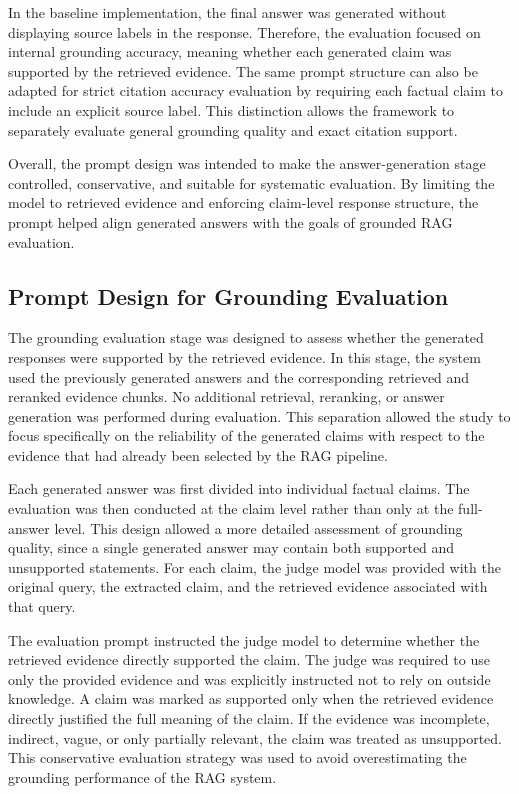 In the baseline implementation, the final answer was generated without displaying source labels in the response. Therefore, the evaluation focused on internal grounding accuracy, meaning whether each generated claim was supported by the retrieved evidence. The same prompt structure can also be adapted for strict citation accuracy evaluation by requiring each factual claim to include an explicit source label. This distinction allows the framework to separately evaluate general grounding quality and exact citation support.

Overall, the prompt design was intended to make the answer-generation stage controlled, conservative, and suitable for systematic evaluation. By limiting the model to retrieved evidence and enforcing claim-level response structure, the prompt helped align generated answers with the goals of grounded RAG evaluation.


\subsection{Prompt Design for Grounding Evaluation}
\label{subsec:prompt_design_evaluation}

The grounding evaluation stage was designed to assess whether the generated responses were supported by the retrieved evidence. In this stage, the system used the previously generated answers and the corresponding retrieved and reranked evidence chunks. No additional retrieval, reranking, or answer generation was performed during evaluation. This separation allowed the study to focus specifically on the reliability of the generated claims with respect to the evidence that had already been selected by the RAG pipeline.

Each generated answer was first divided into individual factual claims. The evaluation was then conducted at the claim level rather than only at the full-answer level. This design allowed a more detailed assessment of grounding quality, since a single generated answer may contain both supported and unsupported statements. For each claim, the judge model was provided with the original query, the extracted claim, and the retrieved evidence associated with that query.

The evaluation prompt instructed the judge model to determine whether the retrieved evidence directly supported the claim. The judge was required to use only the provided evidence and was explicitly instructed not to rely on outside knowledge. A claim was marked as supported only when the retrieved evidence directly justified the full meaning of the claim. If the evidence was incomplete, indirect, vague, or only partially relevant, the claim was treated as unsupported. This conservative evaluation strategy was used to avoid overestimating the grounding performance of the RAG system.

